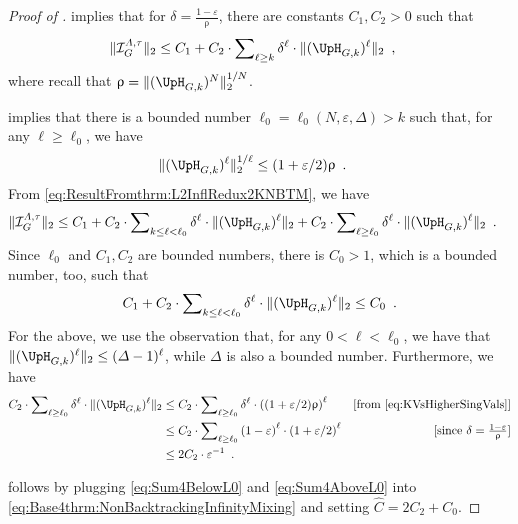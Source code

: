 \documentclass[11pt,reqno]{amsart}
\numberwithin{equation}{section}
\newcommand{\cI}{{\mathcal{I}}}
\newcommand{\applegreen}[1]{ {\color{applegreen}#1}}
\newcommand{\bluepigment}[1]{{\color{blue(pigment)}#1}}
\newcommand{\cadmiumgreen}[1]{{\color{cadmiumgreen}#1}}
\newcommand{\goldenbrown}[1]{{\color{goldenbrown}#1}}
\newcommand{\maxDeg}{{\Delta}}
\newcommand{\infmatrix}{\cI}
\newcommand{\norm}[2]{\goldenbrown{\|} #1 \goldenbrown{\|}_{#2}}
\newcommand{\nnorm}[3]{\goldenbrown{\|} #1\goldenbrown{\|}^{#2}_{#3}}
\newcommand{\NBMatrix}{\cadmiumgreen{\UpH}_{G,\kk}}
\renewcommand{\applegreen}[1]{#1}
\renewcommand{\bluepigment}[1]{#1}
\renewcommand{\cadmiumgreen}[1]{#1}
\renewcommand{\goldenbrown}[1]{#1}
\newcommand{\kk}{\bluepigment{k}}
\newcommand{\kell}{{\color{green(pigment)}\ell}}%
\renewcommand{\kk}{k}
\renewcommand{\kell}{\ell}
\newcommand{\SingBound}{\uprho}
\begin{document}
\begin{proof}[Proof of ]
% 
 implies that for  $\delta =\frac{1-\varepsilon}{\SingBound}$,  there are constants $C_1,C_2>0$ such that
\begin{align}\label{eq:ResultFromthrm:L2InflRedux2KNBTM}
 \norm{ \infmatrix^{\Lambda,\tau}_{G}}{2}  &\leq C_1+C_2 \cdot \sum\nolimits_{\kell \geq \kk} 
\delta^{\kell} \cdot \norm{ (\NBMatrix)^{\kell}}{2} 
 \enspace,
\end{align}
where recall that $\SingBound=\nnorm{ (\NBMatrix)^N}{1/N}{2}$. 

  implies that there is a bounded number $\ell_0=\ell_0(N,\varepsilon, \maxDeg)>k$ such that, 
for any $\kell \geq \ell_0$, we have 
\begin{align}\label{eq:KVsHigherSingVals}
\nnorm{ (\NBMatrix)^{\kell}}{1/\kell}{2}
& \leq   (1+{\varepsilon}/{2}) \SingBound\enspace.
\end{align}
%
%
From \eqref{eq:ResultFromthrm:L2InflRedux2KNBTM}, we  have
\begin{align}\label{eq:Base4thrm:NonBacktrackingInfinityMixing}
 \norm{ \infmatrix^{\Lambda,\tau}_{G}}{2}  &\leq C_1+C_2 \cdot \sum\nolimits_{\kk \leq \kell< \ell_0} 
\delta^{\kell} \cdot \norm{ ( \NBMatrix)^{\kell}}{2} +
C_2 \cdot \sum\nolimits_{\kell \geq \ell_0} 
\delta^{\kell} \cdot \norm{( \NBMatrix)^{\kell}}{2}
 \enspace. 
\end{align}
Since $\ell_0$ and $C_1,C_2$ are bounded numbers, there is ${C}_0>1$, which is a bounded number, too, such that
\begin{align}\label{eq:Sum4BelowL0}
C_1+C_2 \cdot \sum\nolimits_{\kk \leq \kell < \ell_0} 
\delta^{\kell} \cdot \norm{ ( \NBMatrix)^{\kell}}{2} \leq {C}_0 \enspace.
\end{align}
For the above, we use the observation that, for any $0<\kell<\ell_0$, we have that 
$\norm{( \NBMatrix)^{\kell}}{2}  \leq (\maxDeg-1)^{\kell}$, while
$\maxDeg$ is also a bounded number.
%
Furthermore, we have 
\begin{align}
C_2 \cdot \sum\nolimits_{\kell \geq \ell_0} \delta^{\kell} \cdot \norm{( \NBMatrix)^{\kell}}{2} 
& \leq  C_2 \cdot \sum\nolimits_{\kell \geq \ell_0} 
\delta^{\kell} \cdot \left((1+\varepsilon/2)\SingBound\right)^{\kell} & \mbox{[from \eqref{eq:KVsHigherSingVals}]} \nonumber \\
&\leq C_2 \cdot \sum\nolimits_{\kell \geq \ell_0} 
\left( 1-\varepsilon \right)^{\kell} \cdot \left(1+\varepsilon/2\right )^{\kell} & \mbox{[since $\delta=\frac{1-\varepsilon}{\SingBound}$]} \nonumber\\
&\leq 2C_2 \cdot \varepsilon^{-1} \enspace. \label{eq:Sum4AboveL0}
\end{align}


\noindent
{} follows by plugging \eqref{eq:Sum4BelowL0} and \eqref{eq:Sum4AboveL0} into
 \eqref{eq:Base4thrm:NonBacktrackingInfinityMixing} and setting $\widehat{C}=2C_2+{C}_0$.
\end{proof}
\end{document}

